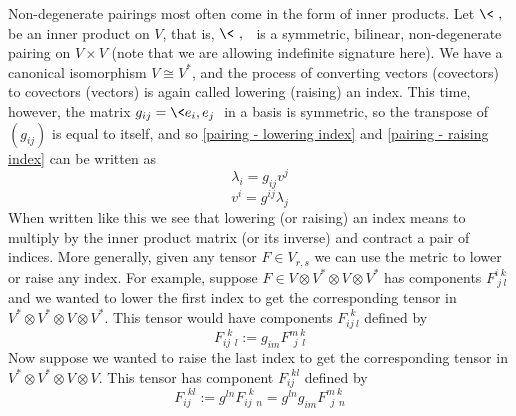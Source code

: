 Non-degenerate pairings most often come in the form of inner products. Let $\<\ ,\ \>$ be an inner product on $V$, that is, $\<\ ,\ \>$ is a symmetric, bilinear, non-degenerate pairing on $V \times V$ (note that we are allowing indefinite signature here). We have a canonical isomorphism $V \cong V^*$, and the process of converting vectors (covectors) to covectors (vectors) is again called lowering (raising) an index. This time, however, the matrix $g_{ij} = \< e_i,e_j \>$ in a basis is symmetric, so the transpose of $(g_{ij})$ is equal to itself, and so \ref{pairing - lowering index} and \ref{pairing - raising index} can be written as
\begin{equation}
\label{lowering index}
\lambda_i = g_{ij} v^j
\end{equation}
\begin{equation}
\label{raising index}
v^i = g^{ij} \lambda_j
\end{equation}
When written like this we see that lowering (or raising) an index means to multiply by the inner product matrix (or its inverse) and contract a pair of indices. More generally, given any tensor $F \in V_{r,s}$ we can use the metric to lower or raise any index. For example, suppose $F \in V \otimes V^* \otimes V \otimes V^*$ has components $F^{i\ k}_{\ j\ l}$ and we wanted to lower the first index to get the corresponding tensor in $V^* \otimes V^* \otimes V \otimes V^*$. This tensor would have components $F^{\ \ k}_{ij\ l}$ defined by
\[ F^{\ \ k}_{ij\ \ l} := g_{im} F^{m\ k}_{\ \ j\ \ l} \]
Now suppose we wanted to raise the last index to get the corresponding tensor in $V^* \otimes V^* \otimes V \otimes V$. This tensor has component $F_{ij}^{\ \ kl}$ defined by
\[ F_{ij}^{\ \ kl} := g^{ln} F^{\ \ k}_{ij\ \ n} = g^{ln} g_{im} F^{m\ k}_{\ \ j\ \ n} \]



